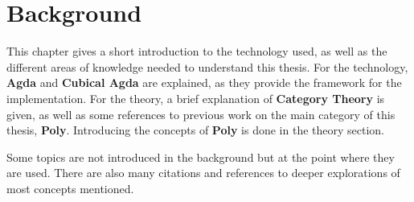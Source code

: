 \chapter{Background}\label{chapter:background}
This chapter gives a short introduction to the technology used, as well as the different areas of knowledge needed to understand this thesis. For the technology, \textbf{Agda} and \textbf{Cubical Agda} are explained, as they provide the framework for the implementation. For the theory, a brief explanation of \textbf{Category Theory} is given, as well as some references to previous work on the main category of this thesis, \textbf{Poly}. Introducing the concepts of \textbf{Poly} is done in the theory section.

Some topics are not introduced in the background but at the point where they are used. There are also many citations and references to deeper explorations of most concepts mentioned.







